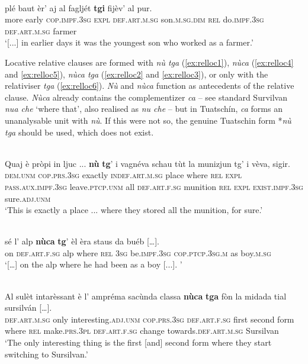 \ea
\label{}
\\
\gll  [...] plé baut èr’ aj al fagljét \textbf{tgi} fijèv’ al pur. \\
{} more early \textsc{cop.impf.3sg} \textsc{expl} \textsc{def.art.m.sg}  son.\textsc{m.sg.dim} \textsc{rel} do.\textsc{impf.3sg} \textsc{def.art.m.sg} farmer \\
\glt `[...] in earlier days it was the youngest son who worked as a farmer.'
\z

Locative relative clauses are formed with \textit{nù tga} (\ref{ex:relloc1}), \textit{nùca} (\ref{ex:relloc4} and \ref{ex:relloc5}), \textit{nùca tga} (\ref{ex:relloc2} and \ref{ex:relloc3}), or only with the relativiser \textit{tga} (\ref{ex:relloc6}). \textit{Nù} and \textit{nùca} function as antecedents of the relative clause. \textit{Nùca} already contains the complementizer \textit{ca} –  see standard Survilvan \textit{nua che} ‘where that’, also realised as \textit{nu che} – but in Tuatschín, \textit{ca} forms an unanalysable unit with \textit{nù}. If this were not so, the genuine Tuatschin form *\textit{nù tga} should be used, which does not exist.

\ea
\label{ex:relloc1}
\\
\gll  Quaj è pròpi in ljuc ... \textbf{nù} \textbf{tg}’ i vagnéva schau tùt la munizjun tg’ i vèva, sigir.\\
\textsc{dem.unm} \textsc{cop.prs.3sg} exactly \textsc{indef.art.m.sg} place {} where \textsc{rel} \textsc{expl} \textsc{pass.aux.impf.3sg} leave.\textsc{ptcp.unm} all \textsc{def.art.f.sg} munition \textsc{rel} \textsc{expl} \textsc{exist.impf.3sg} sure.\textsc{adj.unm}\\
\glt `This is exactly a place ... where they stored all the munition, for sure.'
\z

\ea
\label{ex:relloc2}
\\
\gll   […] sé l’ alp \textbf{nùca} \textbf{tg}’ èl èra staus da buéb […]. \\
     {}  on \textsc{def.art.f.sg} alp where \textsc{rel} \textsc{3sg} be.\textsc{impf.3sg} \textsc{cop.ptcp.3sg.m} as boy.\textsc{m.sg} \\
\glt `[…] on the alp where he had been as a boy [...]. '
\z

\ea
\label{ex:relloc3}
\\
\gll    Al sulèt intarèssant è l’ ampréma sacùnda classa \textbf{nùca} \textbf{tga} fòn la midada tial sursilván […].\\
\textsc{def.art.m.sg} only interesting.\textsc{adj.unm} \textsc{cop.prs.3sg} \textsc{def.art.f.sg} first second form where \textsc{rel} make.\textsc{prs.3pl} \textsc{def.art.f.sg} change towards.\textsc{def.art.m.sg} Sursilvan\\
\glt `The only interesting thing is the first [and] second form where they start switching to Sursilvan.'
\z

